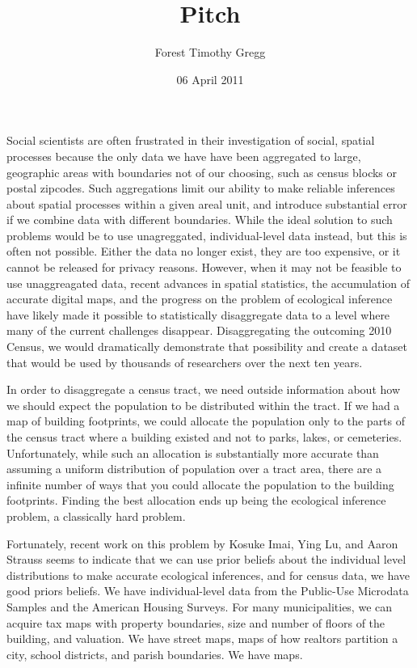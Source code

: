 \documentclass[12pt]{article}
\begin{document}
\title{Pitch}
\author{Forest Timothy Gregg}
\date{06 April 2011}

Social scientists are often frustrated in their investigation of
social, spatial processes because the only data we have have been
aggregated to large, geographic areas with boundaries not of our
choosing, such as census blocks or postal zipcodes. Such aggregations
limit our ability to make reliable inferences about spatial
processes within a given areal unit, and introduce substantial error
if we combine data with different boundaries. While the
ideal solution to such problems would be to use unagreggated,
individual-level data instead, but this is often not possible. Either
the data no longer exist, they are too expensive, or it cannot be
released for privacy reasons. However, when it may not be feasible to
use unaggreagated data, recent advances in spatial statistics, the
accumulation of accurate digital maps, and the progress on the problem
of ecological inference have likely made it possible to statistically
disaggregate data to a level where many of the current challenges
disappear. Disaggregating the outcoming 2010 Census, we would
dramatically demonstrate that possibility and create a dataset that
would be used by thousands of researchers over the next ten years.

In order to disaggregate a census tract, we need outside information
about how we should expect the population to be distributed within the
tract. If we had a map of building footprints, we could
allocate the population only to the parts of the census tract
where a building existed and not to parks, lakes, or
cemeteries. Unfortunately, while such an allocation is substantially
more accurate than assuming a uniform distribution of population over
a tract area, there are a infinite number of ways that you could
allocate the population to the building
footprints. Finding the best allocation ends up being the ecological
inference problem, a classically hard problem.

Fortunately, recent work on this problem by Kosuke Imai, Ying
Lu, and Aaron Strauss seems to indicate that  we can use prior
beliefs about the individual level distributions to make accurate
ecological inferences, and for census data, we have good priors
beliefs. We have individual-level data from the Public-Use Microdata
Samples and the American Housing Surveys. For many municipalities, we
can acquire tax maps with property boundaries, size and number of
floors of the building, and valuation. We have street maps, maps
of how realtors partition a city, school districts, and
parish boundaries. We have maps.
\end{document}
